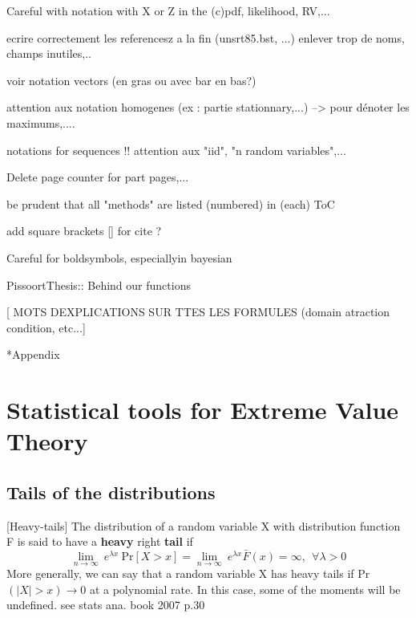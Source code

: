 \documentclass[11pt,a4paper,openany ]{book}
\makeatletter
\renewcommand\part{%
	\if@openright
	\cleardoublepage
	\else
	\clearpage
	\fi
	\thispagestyle{empty}%
	\if@twocolumn
	\onecolumn
	\@tempswatrue
	\else
	\@tempswafalse
	\fi
	\null\vfil
	\secdef\@part\@spart}
\makeatother
\begin{document}
Careful with notation with X or Z in the (c)pdf, likelihood, RV,...

ecrire correctement les referencesz a la fin (unsrt85.bst, ...) enlever trop de noms, champs inutiles,..

voir notation vectors (en gras ou avec bar en bas?)

attention aux notation homogenes (ex : partie stationnary,...) --> pour dénoter les 
maximums,....

notations for sequences !! attention aux "iid", "n random variables",... 

Delete page counter for part pages,...

be prudent that all "methods" are listed (numbered) in (each) ToC

add square brackets [] for cite ? 

Careful for boldsymbols, especiallyin bayesian

PissoortThesis:: Behind our functions 

[ MOTS DEXPLICATIONS SUR TTES LES FORMULES (domain atraction condition, etc...]



\part*{Appendix}

\appendix

\chapter{Statistical tools for Extreme Value Theory}\label{appA}

\section{Tails of the distributions}

[Heavy-tails] The distribution of a random variable X with distribution function F is said 
to have a \textbf{heavy} right \textbf{tail} if 
\begin{equation}
\displaystyle{\lim_{n \to \infty}} \ e^{\lambda x} \ \text{Pr}[X>x]=\displaystyle{\lim_{n 
\to \infty}} \ e^{\lambda x} \bar{F}(x)=\infty , \ \ \forall \lambda>0
\end{equation}
More generally, we can say that a random variable X has heavy tails if Pr$(|X|>x)\to 0$ at 
a polynomial rate. In this case, some of the moments will be undefined. see stats ana. book 
2007 p.30
\end{document}
